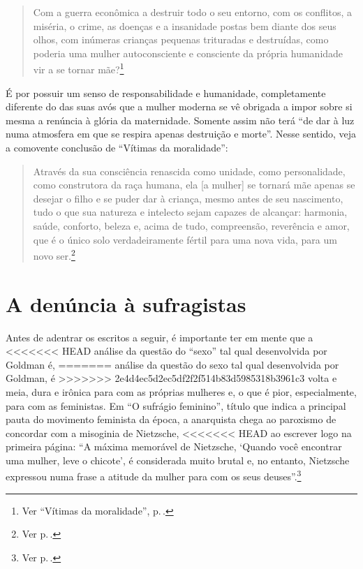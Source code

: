 \begin{quote}
Com a guerra econômica a destruir todo o seu entorno, com os conflitos,
a miséria, o crime, as doenças e a insanidade postas bem diante dos seus
olhos, com inúmeras crianças pequenas trituradas e destruídas, como
poderia uma mulher autoconsciente e consciente da própria humanidade vir
a se tornar mãe?\footnote{Ver ``Vítimas da moralidade'', p.\,\pageref{entorno}.}
\end{quote}
 
É por possuir um senso de
responsabilidade e humanidade, completamente diferente do das suas avós
que a mulher moderna se vê obrigada a impor sobre si mesma a renúncia à
glória da maternidade. Somente assim não terá ``de dar à luz numa
atmosfera em que se respira apenas destruição e morte''. Nesse
sentido, veja a comovente conclusão de ``Vítimas da moralidade'':

\begin{quote}
Através da sua consciência renascida como unidade, como personalidade,
como construtora da raça humana, ela {[}a mulher{]} se tornará mãe apenas se desejar o
filho e se puder dar à criança, mesmo antes de seu nascimento, tudo o
que sua natureza e intelecto sejam capazes de alcançar: harmonia, saúde,
conforto, beleza e, acima de tudo, compreensão, reverência e amor, que é
o único solo verdadeiramente fértil para uma nova vida, para um novo
ser.\footnote{Ver p.\,\pageref{renascida}.}
\end{quote}

\section{A denúncia à sufragistas}

Antes de adentrar os escritos a seguir, é importante ter em mente que a
<<<<<<< HEAD
análise da questão do ``sexo'' tal qual desenvolvida por Goldman é,
=======
análise da questão do sexo tal qual desenvolvida por Goldman, é
>>>>>>> 2e4d4ec5d2ec5df2f2f514b83d5985318b3961c3
volta e meia, dura e irônica para com as próprias mulheres e, o que é
pior, especialmente, para com as feministas. Em ``O sufrágio feminino'',
título que indica a principal pauta do movimento feminista da época, a
anarquista chega ao paroxismo de concordar com a misoginia de Nietzsche,
<<<<<<< HEAD
ao escrever logo na primeira página: ``A máxima memorável de Nietzsche, `Quando você encontrar uma mulher, leve o chicote', é considerada muito brutal e, no entanto, Nietzsche
expressou numa frase a atitude da mulher para com os seus deuses''.\footnote{Ver p.\,\pageref{herege}.}

